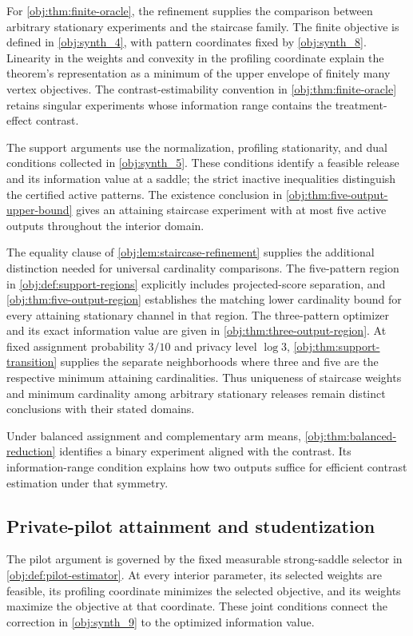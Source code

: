 For \cref{obj:thm:finite-oracle}, the refinement supplies the comparison between arbitrary stationary experiments and the staircase family. The finite objective is defined in \cref{obj:synth_4}, with pattern coordinates fixed by \cref{obj:synth_8}. Linearity in the weights and convexity in the profiling coordinate explain the theorem's representation as a minimum of the upper envelope of finitely many vertex objectives. The contrast-estimability convention in \cref{obj:thm:finite-oracle} retains singular experiments whose information range contains the treatment-effect contrast.

The support arguments use the normalization, profiling stationarity, and dual conditions collected in \cref{obj:synth_5}. These conditions identify a feasible release and its information value at a saddle; the strict inactive inequalities distinguish the certified active patterns. The existence conclusion in \cref{obj:thm:five-output-upper-bound} gives an attaining staircase experiment with at most five active outputs throughout the interior domain.

The equality clause of \cref{obj:lem:staircase-refinement} supplies the additional distinction needed for universal cardinality comparisons. The five-pattern region in \cref{obj:def:support-regions} explicitly includes projected-score separation, and \cref{obj:thm:five-output-region} establishes the matching lower cardinality bound for every attaining stationary channel in that region. The three-pattern optimizer and its exact information value are given in \cref{obj:thm:three-output-region}. At fixed assignment probability \(3/10\) and privacy level \(\log 3\), \cref{obj:thm:support-transition} supplies the separate neighborhoods where three and five are the respective minimum attaining cardinalities. Thus uniqueness of staircase weights and minimum cardinality among arbitrary stationary releases remain distinct conclusions with their stated domains.

Under balanced assignment and complementary arm means, \cref{obj:thm:balanced-reduction} identifies a binary experiment aligned with the contrast. Its information-range condition explains how two outputs suffice for efficient contrast estimation under that symmetry.

\subsection{Private-pilot attainment and studentization}

The pilot argument is governed by the fixed measurable strong-saddle selector in \cref{obj:def:pilot-estimator}. At every interior parameter, its selected weights are feasible, its profiling coordinate minimizes the selected objective, and its weights maximize the objective at that coordinate. These joint conditions connect the correction in \cref{obj:synth_9} to the optimized information value.

